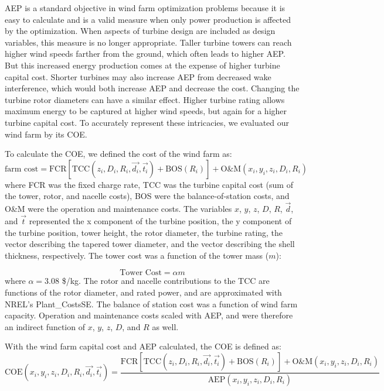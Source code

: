 

AEP is a standard objective in wind farm optimization problems because it is easy to calculate and is a valid measure when only power production is affected by the optimization. When aspects of turbine design are included as design variables, this measure is no longer appropriate. 
Taller turbine towers can reach higher wind speeds farther from the ground, which often leads to higher AEP. But this increased energy production comes at the expense of higher turbine capital cost. Shorter turbines may also increase AEP from decreased wake interference, which would both increase AEP and decrease the cost. Changing the turbine rotor diameters can have a similar effect. Higher turbine rating allows maximum energy to be captured at higher wind speeds, but again for a higher turbine capital cost. To accurately represent these intricacies, we evaluated our wind farm by its COE.

To calculate the COE, we defined the cost of the wind farm as:
\begin{equation}
	\text{farm cost} = \text{FCR}[\text{TCC}(z_i, D_i, R_i, \vec{d_i}, \vec{t_i}) + \text{BOS}(R_i)] + \text{O\&M}(x_i,y_i,z_i, D_i, R_i)
\end{equation}
where FCR was the fixed charge rate, TCC was the turbine capital cost (sum of the tower, rotor, and nacelle costs), BOS were the balance-of-station costs, and O\&M were the operation and maintenance costs. The variables $x$, $y$, $z$, $D$, $R$, $\vec{d}$, and $\vec{t}$ represented the x component of the turbine position, the y component of the turbine position, tower height, the rotor diameter, the turbine rating, the vector describing the tapered tower diameter, and the vector describing the shell thickness, respectively. The tower cost was a function of the tower mass ($m$):

\begin{equation}
	\text{Tower Cost} = \alpha m
\end{equation}
%
where $\alpha = 3.08$ \$/kg. The rotor and nacelle contributions to the TCC are functions of the rotor diameter, and rated power, and are approximated with NREL's Plant\_CostsSE\cite{dykes2014plant_costsse}. The balance of station cost was a function of wind farm capacity\cite{BOS}. Operation and maintenance costs scaled with AEP, and were therefore an indirect function of $x$, $y$, $z$, $D$, and $R$ as well. \cite{mone2013cost}

    With the wind farm capital cost and AEP calculated, the COE is defined as:
    \begin{equation}
			\text{COE}(x_i,y_i,z_i, D_i, R_i, \vec{d_i}, \vec{t_i}) = \frac{\text{FCR}[\text{TCC}(z_i, D_i, R_i, \vec{d_i}, \vec{t_i}) + \text{BOS}(R_i)] + \text{O\&M}(x_i,y_i,z_i, D_i, R_i)}{\text{AEP}(x_i,y_i,z_i,D_i,R_i)}
    \end{equation}
              
